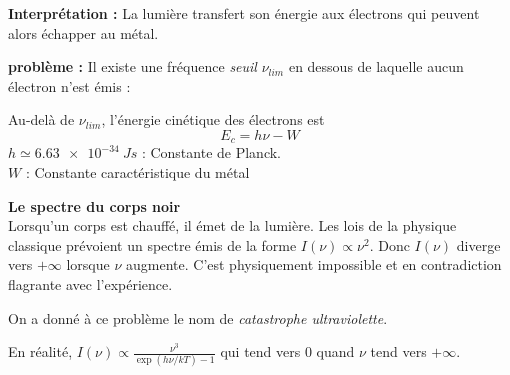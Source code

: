 \documentclass[MPSI]{cours}
\begin{document}
\textbf{Interprétation :} La lumière transfert son énergie aux électrons qui peuvent alors échapper au métal.

\textbf{problème :} Il existe une fréquence \emph{seuil} $\nu_{lim}$ en dessous de laquelle aucun électron n'est émis :
\begin{center}
\end{center}
Au-delà de $\nu_{lim}$, l'énergie cinétique des électrons est 
\begin{equation*}
E_c=h\nu-W
\end{equation*}
$h\simeq\SI{6.63e-34}{Js}$ : Constante de Planck.\\
$W$ : Constante caractéristique du métal

\vspace{2em}
\textbf{Le spectre du corps noir}\\ 

Lorsqu'un corps est chauffé, il émet de la lumière. Les lois de la physique classique prévoient un spectre émis de la forme $I(\nu) \propto \nu^2$. Donc $I(\nu)$ diverge vers $+\infty$ lorsque $\nu$ augmente. C'est physiquement impossible et en contradiction flagrante avec l'expérience.

On a donné à ce problème le nom de \emph{catastrophe ultraviolette}.

En réalité, $I(\nu)\propto \frac{\nu^3}{\exp(h\nu/kT)-1}$ qui tend vers 0 quand $\nu$ tend vers $+\infty$.
\begin{center}
\end{center}
\end{document}
